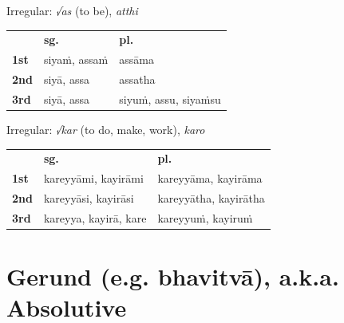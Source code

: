 \documentclass[a4paper]{memoir}
\begin{document}
{\centering\par
\begin{multicols}{2}

Irregular: \emph{√as} (to be), \emph{atthi}

\begin{center}
\begin{tabular}{lll}
 & \textbf{sg.} & \textbf{pl.}\\[0pt]
\textbf{1st} & siyaṁ, assaṁ & assāma\\[0pt]
\textbf{2nd} & siyā, assa & assatha\\[0pt]
\textbf{3rd} & siyā, assa & siyuṁ, assu, siyaṁsu\\[0pt]
\end{tabular}
\end{center}

\columnbreak

Irregular: \emph{√kar} (to do, make, work), \emph{karo}

\begin{center}
\begin{tabular}{lll}
 & \textbf{sg.} & \textbf{pl.}\\[0pt]
\textbf{1st} & kareyyāmi, kayirāmi & kareyyāma, kayirāma\\[0pt]
\textbf{2nd} & kareyyāsi, kayirāsi & kareyyātha, kayirātha\\[0pt]
\textbf{3rd} & kareyya, kayirā, kare & kareyyuṁ, kayiruṁ\\[0pt]
\end{tabular}
\end{center}

\end{multicols}
\par}

\section{Gerund (e.g. bhavitvā), a.k.a. Absolutive}
\label{sec:orgcb1f36d}
\end{document}
